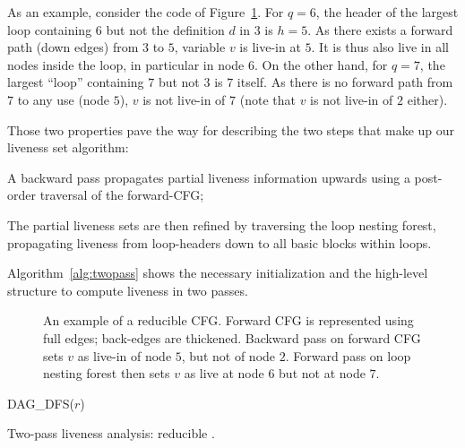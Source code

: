 As an example, consider the code of Figure~\ref{fig:examplecfg_run}. For $q=6$, the header of the largest loop containing $6$ but not the definition $d$ in $3$ is $h=5$. As there exists a forward path (down edges) from $3$ to $5$, variable $v$ is live-in at $5$. It is thus also live in all nodes inside the loop, in particular in node $6$. On the other hand, for $q=7$, the largest ``loop'' containing $7$ but not $3$ is $7$ itself. As there is no forward path from $7$ to any use (node $5$), $v$ is not live-in of $7$ (note that $v$ is not live-in of $2$ either).

Those two properties pave the way for describing the two steps that make up our liveness set algorithm:
\begin{compactenum}
\item
	A backward pass propagates partial liveness information upwards using a post-order traversal of the forward-CFG;
\item
	The partial liveness sets are then refined by traversing the loop nesting forest, propagating liveness from loop-headers down to all basic blocks within loops.
\end{compactenum}
Algorithm~\ref{alg:twopass} shows the necessary initialization and the high-level structure to compute liveness in two passes.

\begin{figure}[t]
   \begin{center}
       \caption{An example of a reducible CFG. Forward CFG is represented using 
       full edges; back-edges are thickened. Backward pass on forward CFG sets 
     $v$ as live-in of node $5$, but not of node $2$. Forward pass on loop 
   nesting forest then sets $v$ as live at node $6$ but not at node $7$. }
       \label{fig:examplecfg_run}
   \end{center}
\end{figure}

\medskip
\begin{algorithm}[H]
      {DAG\_DFS}($r$) 
    \caption{Two-pass liveness analysis: reducible \@CFG.}
  \label{alg:twopass}
\end{algorithm}
\medskip

